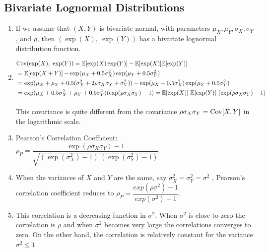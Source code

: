 \subsection{Bivariate Lognormal Distributions}

\begin{enumerate}
    \item  If we assume that $(X, Y)$ is bivariate normal, with parameters $\mu_X , \mu_Y , \sigma_X , \sigma_Y$ , and $\rho$, then $(\exp(X),\ \exp(Y ))$ has a bivariate lognormal distribution function.
    \hfill \cite{statistics/book/Statistics-for-Data-Scientists/Maurits-Kaptein}

    \item
    $
        \begin{aligned}
            &\text{Cov}(\exp(X),\ \exp(Y ))
            = \mathbb{E}[\exp(X) \exp(Y )] - \mathbb{E}[\exp(X)]\mathbb{E}[\exp(Y )] \\
            &= \mathbb{E}[\exp(X + Y )] - \exp(\mu_X + 0.5\sigma^2_X ) \exp(\mu_Y + 0.5\sigma^2_Y ) \\
            &= \exp(\mu_X + \mu_Y + 0.5(\sigma^2_X + 2\rho\sigma_X \sigma_Y + \sigma^2_Y )) - \exp(\mu_X + 0.5\sigma^2_X ) \exp(\mu_Y + 0.5\sigma^2_Y )\\
            &= \exp(\mu_X + 0.5\sigma^2_X + \mu_Y + 0.5\sigma^2_Y )(\exp(\rho\sigma_X \sigma_Y ) - 1)
            = \mathbb{E}[\exp(X)]\ \mathbb{E}[\exp(Y )]\ (\exp(\rho\sigma_X \sigma_Y ) - 1)
        \end{aligned}
    $
    \hfill \cite{statistics/book/Statistics-for-Data-Scientists/Maurits-Kaptein}
    \\
    This covariance is quite different from the covariance $\rho \sigma_X \sigma_Y = \text{Cov}[X, Y] $ in the logarithmic scale.
    \hfill \cite{statistics/book/Statistics-for-Data-Scientists/Maurits-Kaptein}

    \item Pearson’s Correlation Coefficient:
    $
        \rho_P
        = \dfrac{\exp(\rho\sigma_X \sigma_Y ) - 1 }{\sqrt{(\exp(\sigma^2_X ) - 1)\ (\exp(\sigma^2_Y ) - 1)}}
    $
    \hfill \cite{statistics/book/Statistics-for-Data-Scientists/Maurits-Kaptein}

    \item When the variances of $X$ and $Y$ are the same, say $\sigma^2_X = \sigma^2_Y = \sigma^2$ , Pearson’s correlation coefficient reduces to $\rho_P = \dfrac{exp(\rho\sigma^2) - 1}{exp(\sigma^2) - 1}$.
    \hfill \cite{statistics/book/Statistics-for-Data-Scientists/Maurits-Kaptein}

    \item This correlation is a decreasing function in $\sigma^2$.
    When $\sigma^2$ is close to zero the correlation is $\rho$ and when $\sigma^2$ becomes very large the correlations converges to zero.
    On the other hand, the correlation is relatively constant for the variance $\sigma^2 \leq 1$
    \hfill \cite{statistics/book/Statistics-for-Data-Scientists/Maurits-Kaptein}


\end{enumerate}



